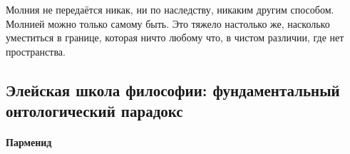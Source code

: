 
Молния не передаётся никак, ни по наследству, никаким другим способом. Молнией можно только самому быть. Это тяжело настолько же, насколько уместиться в границе, которая ничто любому что, в чистом различии, где нет пространства. 

\subsection{Элейская школа философии: фундаментальный онтологический парадокс}

\paragraph{Парменид}




